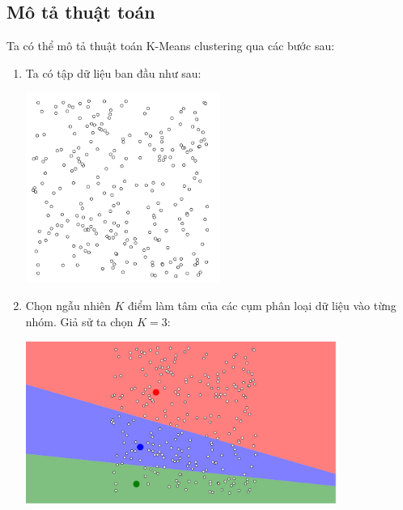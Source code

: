 \subsection{Mô tả thuật toán}
Ta có thể mô tả thuật toán K-Means clustering qua các bước sau:
\begin{enumerate}
	\item Ta có tập dữ liệu ban đầu như sau:
	      \begin {center}
	      \includegraphics[width=0.5\textwidth]{images/KMeanStep/1.PNG}
	      \end{center}

	\item Chọn ngẫu nhiên $K$ điểm làm tâm của các cụm  phân loại dữ liệu vào từng nhóm. Giả sử ta chọn $K = 3$:
	      \begin{center}
		      \includegraphics[width=0.8\textwidth]{images/KMeanStep/2.PNG}
	      \end{center}


\end{enumerate}

